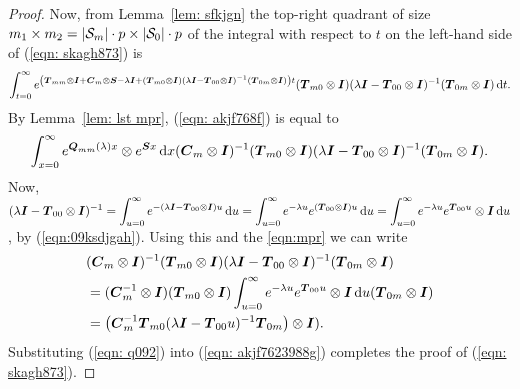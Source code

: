 \begin{proof}
	Now, from Lemma~\ref{lem: sfkjgn} the top-right quadrant of size \(m_1\times m_2=|\mathcal{S}_m|\cdot p\times |\mathcal{S}_0|\cdot p\) of the integral with respect to \(t\) on the left-hand side of (\ref{eqn: skagh873}) is 
	\begin{align}
		\int_{t=0}^\infty e^{\left(\boldsymbol T_{mm}\otimes \boldsymbol I + \boldsymbol C_m\otimes \boldsymbol S - \lambda \boldsymbol I+ (\boldsymbol T_{m0}\otimes \boldsymbol I)(\lambda \boldsymbol I-\boldsymbol T_{00}\otimes \boldsymbol I)^{-1}(\boldsymbol T_{0m}\otimes \boldsymbol I)\right)t}(\boldsymbol T_{m0}\otimes \boldsymbol I)(\lambda \boldsymbol I - \boldsymbol T_{00}\otimes \boldsymbol I)^{-1}(\boldsymbol T_{0m}\otimes \boldsymbol I)\, \mathrm{d} t. \label{eqn: akjf768f}
	\end{align}
	By Lemma~\ref{lem: lst mpr}, (\ref{eqn: akjf768f}) is equal to 
	\begin{align}
		\int_{x=0}^\infty e^{\boldsymbol Q_{mm}(\lambda)x}\otimes e^{\boldsymbol Sx}\, \mathrm{d} x(\boldsymbol C_m\otimes \boldsymbol I)^{-1}(\boldsymbol T_{m0}\otimes \boldsymbol I)(\lambda \boldsymbol I - \boldsymbol T_{00}\otimes \boldsymbol I)^{-1}(\boldsymbol T_{0m}\otimes \boldsymbol I) . \label{eqn: akjf7623988g}
	\end{align}
	Now, \(\displaystyle (\lambda \boldsymbol I - \boldsymbol T_{00}\otimes \boldsymbol I)^{-1} = \int_{u=0}^\infty e^{-(\lambda \boldsymbol I - \boldsymbol T_{00}\otimes \boldsymbol I)u}\, \mathrm{d} u = \int_{u=0}^\infty e^{-\lambda u} e^{(\boldsymbol T_{00}\otimes \boldsymbol I)u}\, \mathrm{d} u = \int_{u=0}^\infty e^{-\lambda u} e^{\boldsymbol T_{00}u}\otimes \boldsymbol I \, \mathrm{d} u\), by (\ref{eqn:09ksdjgah}). Using this and the \ref{eqn:mpr} we can write  
	\begin{align}
		&(\boldsymbol C_m\otimes \boldsymbol I)^{-1}(\boldsymbol T_{m0}\otimes \boldsymbol I)(\lambda \boldsymbol I - \boldsymbol T_{00}\otimes \boldsymbol I)^{-1}(\boldsymbol T_{0m}\otimes \boldsymbol I) \nonumber
		\\&= (\boldsymbol C_m^{-1}\otimes \boldsymbol I)(\boldsymbol T_{m0}\otimes \boldsymbol I)\int_{u=0}^\infty e^{-\lambda u} e^{\boldsymbol T_{00}u}\otimes \boldsymbol I \, \mathrm{d} u(\boldsymbol T_{0m}\otimes \boldsymbol I) \nonumber
		\\&= \left(\boldsymbol C_m^{-1}\boldsymbol T_{m0}(\lambda \boldsymbol I-\boldsymbol T_{00}u)^{-1}\boldsymbol T_{0m}\right)\otimes \boldsymbol I).\label{eqn: q092}
	\end{align}
	Substituting (\ref{eqn: q092}) into (\ref{eqn: akjf7623988g}) completes the proof of (\ref{eqn: skagh873}). 


\end{proof}
